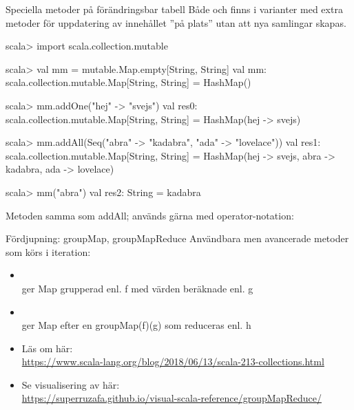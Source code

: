 \begin{Slide}{Speciella metoder på förändringsbar tabell}\SlideFontSmall
Både  och  finns i  varianter med extra metoder för uppdatering av innehållet ''på plats'' utan att nya samlingar skapas.
\begin{REPLsmall}
scala> import scala.collection.mutable

scala> val mm = mutable.Map.empty[String, String]
val mm: scala.collection.mutable.Map[String, String] = HashMap()

scala> mm.addOne("hej" -> "svejs")
val res0: scala.collection.mutable.Map[String, String] = 
  HashMap(hej -> svejs)

scala> mm.addAll(Seq("abra" -> "kadabra", "ada" -> "lovelace"))
val res1: scala.collection.mutable.Map[String, String] = 
  HashMap(hej -> svejs, abra -> kadabra, ada -> lovelace)

scala> mm("abra")
val res2: String = kadabra
\end{REPLsmall}
Metoden \code{++=} samma som addAll; används gärna med operator-notation:\\
\end{Slide}

\begin{Slide}{Fördjupning: groupMap, groupMapReduce}\SlideFontSmall
  Användbara men avancerade metoder som körs i  iteration:
  \begin{itemize}
    \item {}\\ger Map grupperad enl. f med värden beräknade enl. g 
    \item {}\\ger Map efter en groupMap(f)(g) som reduceras enl. h 
    \item Läs om  här:\\
    \url{https://www.scala-lang.org/blog/2018/06/13/scala-213-collections.html}
    \item Se visualisering av  här:\\
    \url{https://superruzafa.github.io/visual-scala-reference/groupMapReduce/}
  \end{itemize}
\end{Slide}





